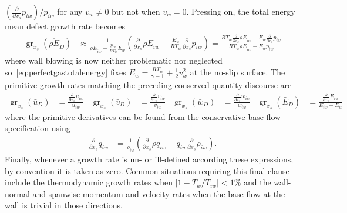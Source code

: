 \documentclass[letterpaper,11pt,nointlimits,reqno,draft]{amsbook}
\begin{document}
$\left(\frac{\partial}{\partial x_s} {p}_{iw}\right) / p_{iw}$ for any $v_w \neq
0$ but not when $v_w = 0$.
%
Pressing on, the total energy mean defect growth rate becomes
\begin{align}
    \operatorname{gr}_{x_s}\!\left(\overline{\rho E}_{D}\right)
    &\approx
    \frac{1}{{\rho E}_{iw} - \frac{p_{iw}}{R T_w} E_w}
    \left(
          \frac{\partial}{\partial x_s}         {\rho E}_{iw}
        - \frac{E_w}{R T_w} \frac{\partial}{\partial x_s} {p}_{iw}
    \right)
    =
    \frac{
          R T_w \frac{\partial}{\partial x_s} {\rho E}_{iw}
        -   E_w \frac{\partial}{\partial x_s} {p     }_{iw}
    }{
        R T_w {\rho E}_{iw} - E_w p_{iw}
    }
\end{align}
where wall blowing is now neither problematic nor neglected
so~\eqref{eq:perfectgastotalenergy} fixes $E_w = \frac{R T_w}{\gamma - 1} +
\frac{1}{2} v_w^2$ at the no-slip surface.
%
The primitive growth rates matching
the preceding conserved quantity discourse are
\begin{align}
    \operatorname{gr}_{x_s}\!\left(\bar{u}_{D}\right)
    &=
    \frac{
        \frac{\partial}{\partial x_s}          {u}_{iw}
    }{
        {u}_{iw}
    }
    &
    \operatorname{gr}_{x_s}\!\left(\bar{v}_{D}\right)
    &=
    \frac{
        \frac{\partial}{\partial x_s}          {v}_{iw}
    }{
        {v}_{iw}
    }
    &
    \operatorname{gr}_{x_s}\!\left(\bar{w}_{D}\right)
    &=
    \frac{
        \frac{\partial}{\partial x_s}          {w}_{iw}
    }{
        {w}_{iw}
    }
    &
    \operatorname{gr}_{x_s}\!\left(\bar{E}_{D}\right)
    &=
    \frac{
        \frac{\partial}{\partial x_s}          {E}_{iw}
    }{
        {E}_{iw} - E_w
    }
\end{align}
where the primitive derivatives can be found from the conservative base flow
specification using
\begin{align}
    \frac{\partial}{\partial x_s} q_{iw} &= \frac{1}{\rho_{iw}}\left(
          \frac{\partial}{\partial x_s} {\rho q}_{iw}
        - q_{iw} \frac{\partial}{\partial x_s} \rho_{iw}
    \right)
    .
\end{align}
Finally, whenever a growth rate is un- or ill-defined according these
expressions, by convention it is taken as zero.  Common situations requiring
this final clause include the thermodynamic growth rates when $\left| 1 - T_w /
T_{iw} \right| < 1\%$ and the wall-normal and spanwise momentum and velocity
rates when the base flow at the wall is trivial in those directions.
\end{document}
